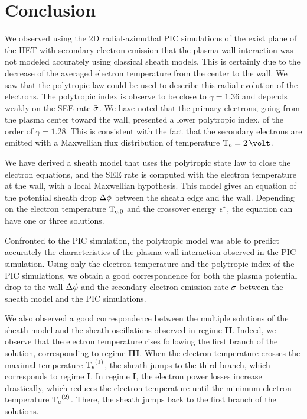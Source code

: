 

\section{Conclusion} \label{subsec-concuslion_ch4}

We observed using the \ac{2D} radial-azimuthal \ac{PIC} simulations of the exist plane of the \ac{HET} with secondary electron emission that the plasma-wall interaction was not modeled accurately using classical sheath models.
This is certainly due to the decrease of the averaged electron temperature from the center to the wall.
We saw that the polytropic law could be used to describe this radial evolution of the electrons.
The polytropic index is observe to be close to $\gamma=1.36$ and depends weakly on the \ac{SEE} rate $ \bar{\sigma }$.
We have noted that the primary electrons, going from the plasma center toward the wall, presented a lower polytropic index, of the order of $\gamma=1.28$.
This is consistent with the fact that the secondary electrons are emitted with a Maxwellian flux distribution of temperature $\Te=2\,\volt$.

We have derived a sheath model that uses the polytropic state law to close the electron equations, and the \ac{SEE} rate is computed with the electron temperature at the wall, with a local Maxwellian hypothesis.
This model gives an equation of the potential sheath drop $\Delta \phi$ between the sheath edge and the wall.
Depending on the electron temperature $\mathrm{T_{e, 0}}$ and the crossover energy $\epsilon^{*}$, the equation can have one or three solutions.

Confronted to the \ac{PIC} simulation, the polytropic model was able to predict accurately the characteristics of the plasma-wall interaction observed in the \ac{PIC} simulation.
Using only the electron temperature and the polytropic index of the \ac{PIC} simulations, we obtain a good correspondence for both the plasma potential drop to the wall $\Delta \phi$ and the secondary electron emission rate $ \bar{\sigma }$ between the sheath model and the \ac{PIC} simulations.

We also observed a good correspondence between the multiple solutions of the sheath model and the sheath oscillations observed in regime {\bf II}.
Indeed, we observe that the electron temperature rises following the first branch of the solution, corresponding to regime {\bf III}.
When the electron temperature crosses the maximal temperature $\mathrm{T_e}^{(1)}$, the sheath jumps to the third branch, which corresponds to regime {\bf I}.
In regime {\bf I}, the electron power losses increase drastically, which reduces the electron temperature until the minimum electron temperature $\mathrm{T_e}^{(2)}$.
There, the sheath jumps back to the first branch of the solutions.


